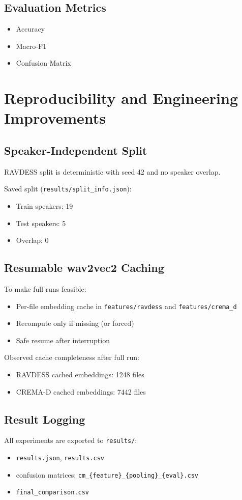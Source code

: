 \documentclass[11pt,a4paper]{article}
\begin{document}
\subsection{Evaluation Metrics}
\begin{itemize}
    \item Accuracy
    \item Macro-F1
    \item Confusion Matrix
\end{itemize}

\section{Reproducibility and Engineering Improvements}
\subsection{Speaker-Independent Split}
RAVDESS split is deterministic with seed 42 and no speaker overlap.

Saved split (\texttt{results/split\_info.json}):
\begin{itemize}
    \item Train speakers: 19
    \item Test speakers: 5
    \item Overlap: 0
\end{itemize}

\subsection{Resumable wav2vec2 Caching}
To make full runs feasible:
\begin{itemize}
    \item Per-file embedding cache in \texttt{features/ravdess} and \texttt{features/crema\_d}
    \item Recompute only if missing (or forced)
    \item Safe resume after interruption
\end{itemize}

Observed cache completeness after full run:
\begin{itemize}
    \item RAVDESS cached embeddings: 1248 files
    \item CREMA-D cached embeddings: 7442 files
\end{itemize}

\subsection{Result Logging}
All experiments are exported to \texttt{results/}:
\begin{itemize}
    \item \texttt{results.json}, \texttt{results.csv}
    \item confusion matrices: \texttt{cm\_\{feature\}\_\{pooling\}\_\{eval\}.csv}
    \item \texttt{final\_comparison.csv}
\end{itemize}
\end{document}
